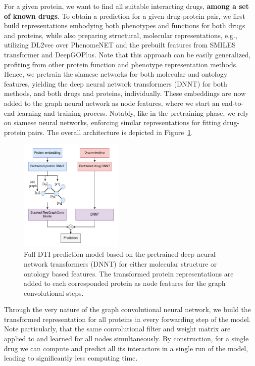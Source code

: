 \documentclass{bioinfo}
\begin{document}
For a given protein, we want to find all suitable interacting drugs, \textbf{among a set of known drugs}.
To obtain a prediction for a given drug-protein pair, we first
build representations embodying both phenotypes and functions for both drugs and proteins, while also preparing structural, molecular representations, e.g., utilizing DL2vec over PhenomeNET and the prebuilt features from SMILES transformer and DeepGOPlus. Note that this approach can be easily generalized, profiting from other protein function and phenotype representation methods. \\ 
Hence, we pretrain the siamese networks for both molecular and ontology features, yielding the deep neural network transformers (DNNT) for both methods, and both drugs and proteins, individually. These embeddings are now added to the graph neural network as node features, where we start an end-to-end learning and training process. Notably, like in the pretraining phase, we rely on siamese neural networks, enforcing similar representations for fitting drug-protein pairs. The overall architecture is depicted in Figure~\ref{fig:Fullmodel}.\\

\begin{figure}[!tpb]
	\centerline{\includegraphics[width=0.45\textwidth]{figures/full_model.png}}
	\caption{Full DTI prediction model based on the pretrained deep neural network transformers (DNNT) for either molecular structure or ontology based features. The transformed protein representations are added to each corresponded protein as node features for the graph convolutional steps. }
	\label{fig:Fullmodel}
\end{figure}

Through the very nature of the graph convolutional neural network, we build the transformed representation for all proteins in every forwarding step of the model. Note particularly, that the same convolutional filter and weight matrix are applied to and learned for all nodes simultaneously. By construction, for a single drug we can compute and predict all its interactors in a single run of the model, leading to significantly less computing time. 
\end{document}
